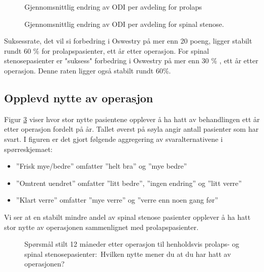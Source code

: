 \begin{figure}[h] 
\caption{Gjennomsnittlig endring av ODI per avdeling for prolaps}
\label{fig:OswEndrAvdPro}
\end{figure}

\begin{figure}[h] 
\caption{Gjennomsnittlig endring av ODI per avdeling for spinal stenose.}
\label{fig:OswEndrAvdSS}
\end{figure}




Suksessrate, det vil si forbedring i Oswestry på mer enn 20 poeng, ligger stabilt rundt 60 \% for prolapspasienter, ett år etter operasjon. 
For spinal stenosepasienter er "suksess" forbedring i Oswestry på mer enn 30 \% , ett år etter operasjon. Denne raten ligger også stabilt rundt 60\%.


\clearpage


\subsection{Opplevd nytte av operasjon}

Figur \ref{fig:Nytte} viser hvor stor nytte pasientene opplever å ha hatt av behandlingen ett år etter operasjon fordelt på år. Tallet øverst på søyla angir antall pasienter som har svart. 
I figuren er det gjort følgende aggregering av svaralternativene i spørreskjemaet:
\begin{itemize}
\item ''Frisk mye/bedre'' omfatter ''helt bra'' og ''mye bedre'' 
\item ''Omtrent uendret'' omfatter ''litt bedre'', ''ingen endring'' og ''litt verre'' 
\item ''Klart verre'' omfatter ''mye verre'' og ''verre enn noen gang før''
\end{itemize}

Vi ser at en stabilt mindre andel av spinal stenose pasienter opplever å ha hatt stor nytte av operasjonen sammenlignet 
med prolapspasienter.



\begin{figure}[h] 
\begin{center}
\end{center}
\caption{Spørsmål stilt 12 måneder etter operasjon til henholdsvis prolaps- og spinal stenosepasienter$:$ Hvilken nytte mener du at du har hatt av operasjonen?}
\label{fig:Nytte}
\end{figure}

